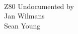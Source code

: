 
\title{\BookTitle}
\author{\AuthorNameSurname}
\date{\LatestRevisionName}


\begin{titlepage}
	\newcommand{\BigFont}[1]{\fontsize{30}{30}\selectfont #1}
	\newcommand{\MidFont}[1]{\fontsize{21.4}{21}\selectfont #1}
	\newcommand{\SmallFont}[1]{\fontsize{14}{14}\selectfont #1}
	\newcommand{\MiniFont}[1]{\fontsize{8}{8}\selectfont #1}
	
	\WorkInProgressFullScreen

	\vspace*{\fill}

	\begin{flushright}
		\sffamily

		\textbf{
			\BigFont{\BookTitleMain}
			\\[0.5cm]
			\MidFont{\BookTitleSub\hspace*{-0.8ex}}
		}

		\vspace*{2cm}

		\MidFont{\AuthorNameSurname}

		\vspace*{5cm}

		\SmallFont{Z80 Undocumented by}\\
		\SmallFont{Jan Wilmans}\\
		\SmallFont{Sean Young}

	\end{flushright}

	\vspace*{\fill}

	\WorkInProgressFullScreen
	
\end{titlepage}
